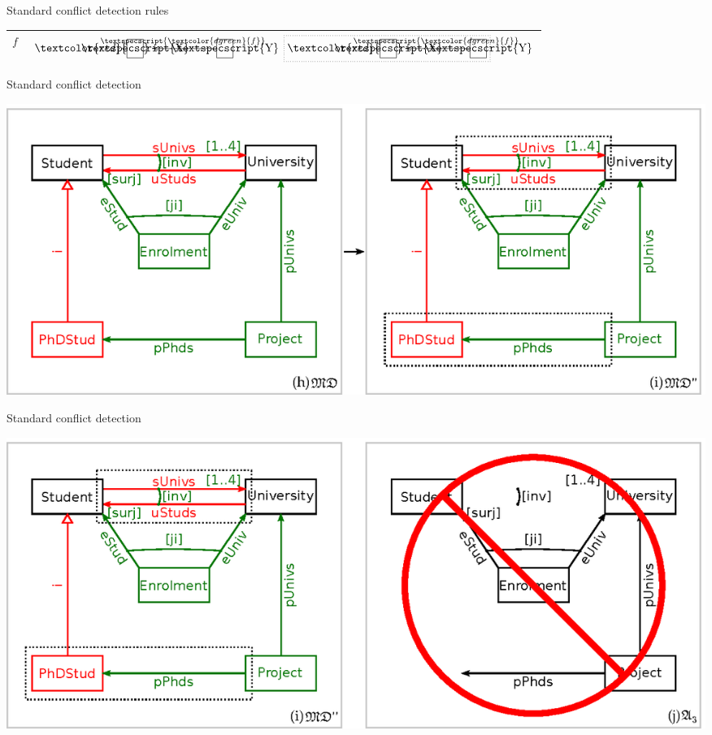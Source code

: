 \documentclass[dvips,slidetop,mathserif,brown]{beamer}
\begin{document}
\begin{frame}{Standard conflict detection rules}
\begin{center}
{\begin{tabular}{|c|c|c|c|}
        \hline
          $f$ &
          $\xymatrix{\textcolor{red}{\framebox[1.5em][c]{\textspecscript{X}}} & & \ar@*{[dgreen]}[ll]_-{\textspecscript{\textcolor{dgreen}{f}}} \framebox[1.5em][c]{\textspecscript{Y}}}$ &
          $\xymatrix{\textcolor{red}{\framebox[1.5em][c]{\textspecscript{X}}} & & \ar@*{[dgreen]}[ll]_-{\textspecscript{\textcolor{dgreen}{f}}} \framebox[1.5em][c]{\textspecscript{Y}} \save [ll].[]*[F.]\frm{} \restore}$ \\
        \hline
      \end{tabular}
    }
  \end{center}
\end{frame}

\begin{frame}{Standard conflict detection}
  \begin{center}
    \includegraphics[width=\textwidth]{ex_project_vc_standard_md_md2}
  \end{center}
\end{frame}

\begin{frame}{Standard conflict detection}
  \begin{center}
    \includegraphics[width=\textwidth]{ex_project_vc_standard_extraction}
  \end{center}
\end{frame}
\end{document}
